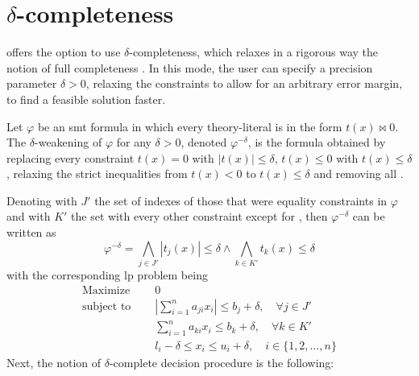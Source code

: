 \documentclass[runningheads]{llncs}
\begin{document}
\section{$\delta$-completeness}
\label{sec:delta-completeness}

\dlinear offers the option to use $\delta$-completeness, which relaxes in a rigorous way the notion of full completeness \cite{delta-dec}. In this mode, the user can specify a precision parameter $\delta > 0$, relaxing the constraints to allow for an arbitrary error margin, to find a feasible solution faster.

\begin{definition}\cite{delta-dec}
    Let $\varphi$ be an \gls{smt} formula in which every theory-literal is in the form $t(x) \bowtie 0$.
    The $\delta$-weakening of $\varphi$ for any $\delta > 0$, denoted $\varphi^{-\delta}$, is the formula obtained by replacing every constraint $t(x) = 0$ with $|t(x)| \le \delta$, $t(x) \le 0$ with $t(x) \le \delta$, relaxing the strict inequalities from $t(x) < 0$ to $t(x) \le \delta$ and removing all \nqcs.
\end{definition}
Denoting with $J'$ the set of indexes of those that were equality constraints in $\varphi$ and with $K'$ the set with every other constraint except for \nqcs, then $\varphi^{-\delta}$ can be written as
\begin{equation*}
    \varphi^{-\delta} = \bigwedge_{j \in J'} |t_j(x)| \le \delta \wedge \bigwedge_{k \in K'} t_k(x) \le \delta
\end{equation*}
with the corresponding \gls{lp} problem being
\begin{equation}
    \label{eq:delta-lp}
    \begin{split}
        \text{Maximize }   \quad & 0                                                                                \\
        \text{subject to } \quad & \left|\sum_{i=1}^{n} a_{ji}x_{i}\right| \le b_j + \delta, \quad \forall j \in J' \\
        \quad                    & \sum_{i=1}^{n} a_{ki}x_{i} \le b_k + \delta, \quad \forall k \in K'              \\
        \quad                    & l_i - \delta \le x_i \le u_i + \delta,  \quad i \in \{1, 2, \ldots, n\}
    \end{split}
\end{equation}
Next, the notion of $\delta$-complete decision procedure is the following:
\end{document}
